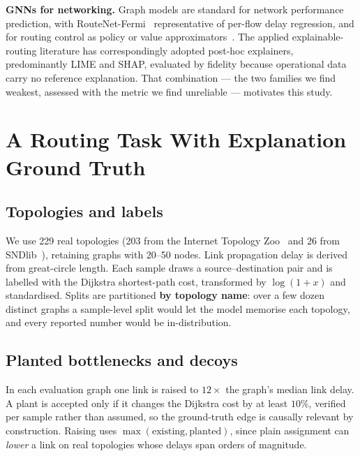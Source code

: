 \documentclass[conference]{IEEEtran}
\begin{document}
\textbf{GNNs for networking.} Graph models are standard for network
performance prediction, with RouteNet-Fermi~\cite{ferriol2023routenetfermi}
representative of per-flow delay regression, and for routing control as policy
or value approximators~\cite{almasan2022drlgnn}. The applied
explainable-routing literature has correspondingly adopted post-hoc
explainers, predominantly LIME and SHAP, evaluated by fidelity because
operational data carry no reference explanation. That combination --- the two
families we find weakest, assessed with the metric we find unreliable ---
motivates this study.

\section{A Routing Task With Explanation Ground Truth}
\label{sec:data}
\subsection{Topologies and labels}
We use 229 real topologies (203 from the Internet Topology
Zoo~\cite{knight2011topologyzoo} and 26 from SNDlib~\cite{orlowski2010sndlib}),
retaining graphs with 20--50 nodes. Link propagation delay is derived from
great-circle length. Each sample draws a source--destination pair and is
labelled with the Dijkstra shortest-path cost, transformed by $\log(1+x)$ and
standardised. Splits are partitioned \textbf{by topology name}: over a few dozen distinct
graphs a sample-level split would let the model memorise each topology, and
every reported number would be in-distribution.

\subsection{Planted bottlenecks and decoys}
In each evaluation graph one link is raised to $12\times$ the graph's median
link delay. A plant is accepted only if it changes the Dijkstra cost by at
least $10\%$, verified per sample rather than assumed, so the ground-truth
edge is causally relevant by construction. Raising uses
$\max(\text{existing}, \text{planted})$, since plain assignment can
\emph{lower} a link on real topologies whose delays span orders of magnitude.
\end{document}
